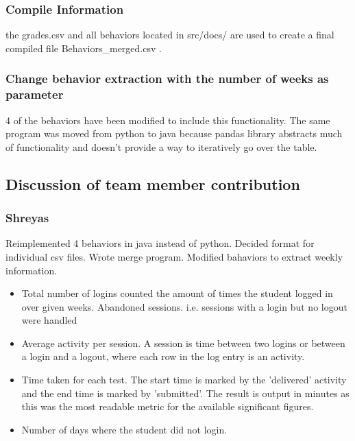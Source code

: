 \documentclass[12pt]{article}
\begin{document}
	\subsubsection{Compile Information}
	the grades.csv and all behaviors located in src/docs/ are used to create a final compiled file Behaviors\_merged.csv .
	
	\subsubsection{Change behavior extraction with the number of weeks as parameter}
	4 of the behaviors have been modified to include this functionality. The same program was moved from python to java because pandas library abstracts much of functionality and doesn't provide a way to iteratively go over the table.
	\subsection{Discussion of team member contribution}
	\subsubsection{Shreyas}
	Reimplemented 4 behaviors in java instead of python. Decided format for individual csv files. Wrote merge program. Modified bahaviors to extract weekly information.
	
	\begin{itemize}
		\item Total number of logins counted the amount of times the student logged in over given weeks. Abandoned sessions. i.e. sessions with a login but no logout were handled
		\item Average activity per session. A session is time between two logins or between a login and a logout, where each row in the log entry is an activity.
		\item Time taken for each test. The start time is marked by the 'delivered' activity and the end time is marked by 'submitted'. The result is output in minutes as this was the most readable metric for the available significant figures.
		\item Number of days where the student did not login. 
	\end{itemize}
	
\end{document}
